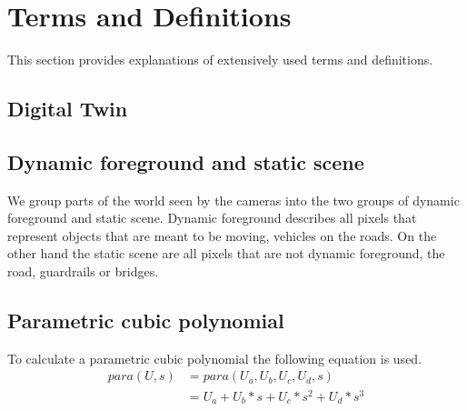 
\section{Terms and Definitions}
This section provides explanations of extensively used terms and definitions. 

\subsection{Digital Twin}
\label{sec:digital_twin}

\subsection{Dynamic foreground and static scene}
\label{sec:dynamic_foreground_static_scene}
We group parts of the world seen by the cameras into the two groups of dynamic foreground and static scene.
Dynamic foreground describes all pixels that represent objects that are meant to be moving, \eg{} vehicles on the roads.
On the other hand the static scene are all pixels that are not dynamic foreground, \eg{} the road, guardrails or bridges.

\subsection{Parametric cubic polynomial}
To calculate a parametric cubic polynomial the following equation is used.
\begin{equation}
    \begin{split}
        para(U, s) &= para(U_a, U_b, U_c, U_d, s) \\ &= U_a + U_b * s + U_c * s^2 + U_d * s^3
    \end{split}
\end{equation}